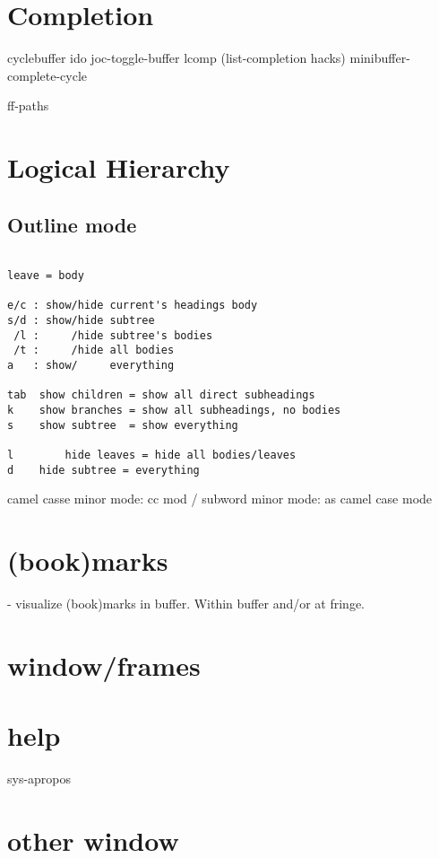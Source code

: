 \documentclass[a4paper]{report}
\begin{document}
\section{Completion}
cyclebuffer
ido
joc-toggle-buffer
lcomp (list-completion hacks)
minibuffer-complete-cycle

ff-paths

\section{Logical Hierarchy}

\subsection{Outline mode}
\begin{verbatim}

leave = body

e/c : show/hide current's headings body 
s/d : show/hide subtree 
 /l :     /hide subtree's bodies 
 /t :     /hide all bodies
a   : show/     everything

tab  show children = show all direct subheadings
k    show branches = show all subheadings, no bodies
s    show subtree  = show everything

l		 hide leaves = hide all bodies/leaves
d    hide subtree = everything
\end{verbatim}
camel casse minor mode:
cc mod / subword minor mode: as camel case mode

\section{(book)marks}

- visualize (book)marks in buffer. Within buffer and/or at fringe.

\section{window/frames}

\section{help}
sys-apropos

\section{other window}
\end{document}
